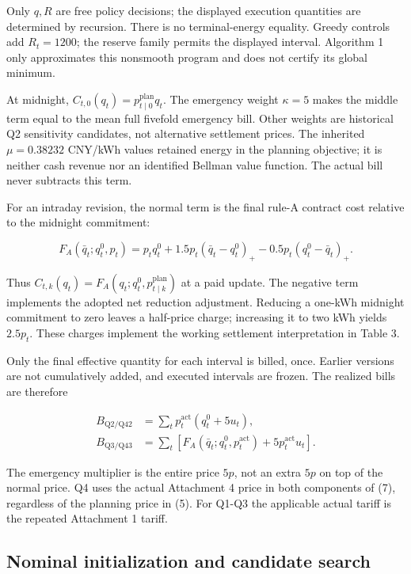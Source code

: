 Only \(q,R\) are free policy decisions; the displayed execution quantities are determined by recursion. There is no terminal-energy equality. Greedy controls add \(R_t=1200\); the reserve family permits the displayed interval. Algorithm 1 only approximates this nonsmooth program and does not certify its global minimum.

At midnight, \(C_{t,0}(q_t)=p^{\mathrm{plan}}_{t\mid0}q_t\). The emergency weight \(\kappa=5\) makes the middle term equal to the mean full fivefold emergency bill. Other weights are historical Q2 sensitivity candidates, not alternative settlement prices. The inherited \(\mu=0.38232\) CNY/kWh values retained energy in the planning objective; it is neither cash revenue nor an identified Bellman value function. The actual bill never subtracts this term.


For an intraday revision, the normal term is the final rule-A contract cost relative to the midnight commitment:

\[
F_A(\bar q_t;q_t^0,p_t)=p_tq_t^0
 +1.5p_t(\bar q_t-q_t^0)_+
 -0.5p_t(q_t^0-\bar q_t)_+. \tag{6}
\]

Thus \(C_{t,k}(q_t)=F_A(q_t;q_t^0,p^{\mathrm{plan}}_{t\mid k})\) at a paid update. The negative term implements the adopted net reduction adjustment. Reducing a one-kWh midnight commitment to zero leaves a half-price charge; increasing it to two kWh yields \(2.5p_t\). These charges implement the working settlement interpretation in Table 3.


Only the final effective quantity for each interval is billed, once. Earlier versions are not cumulatively added, and executed intervals are frozen. The realized bills are therefore

\[
\begin{aligned}
B_{\mathrm{Q2/Q42}}&=\sum_t p_t^{\mathrm{act}}(q_t^0+5u_t),\\
B_{\mathrm{Q3/Q43}}&=\sum_t\left[
F_A(\bar q_t;q_t^0,p_t^{\mathrm{act}})+5p_t^{\mathrm{act}}u_t\right].
\end{aligned} \tag{7}
\]

The emergency multiplier is the entire price \(5p\), not an extra \(5p\) on top of the normal price. Q4 uses the actual Attachment 4 price in both components of (7), regardless of the planning price in (5). For Q1-Q3 the applicable actual tariff is the repeated Attachment 1 tariff.

\subsection{Nominal initialization and candidate search}\label{nominal-initialization-and-candidate-search}

